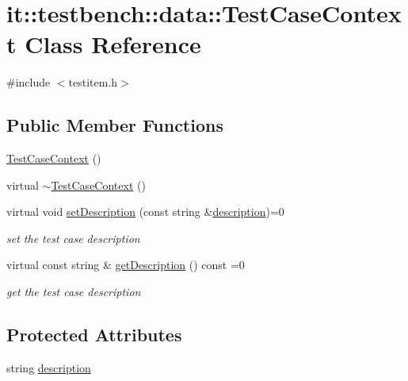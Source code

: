 \hypertarget{classit_1_1testbench_1_1data_1_1TestCaseContext}{\section{it\-:\-:testbench\-:\-:data\-:\-:Test\-Case\-Context Class Reference}
\label{d9/d60/classit_1_1testbench_1_1data_1_1TestCaseContext}
}


{\ttfamily \#include $<$testitem.\-h$>$}

\subsection*{Public Member Functions}
\begin{DoxyCompactItemize}
\item 
\hyperlink{classit_1_1testbench_1_1data_1_1TestCaseContext_ab9ad6284ea841be133f8eca9dd45109a}{Test\-Case\-Context} ()
\item 
virtual \hyperlink{classit_1_1testbench_1_1data_1_1TestCaseContext_ae3883c1f16325e36894d9215b9a19e5b}{$\sim$\-Test\-Case\-Context} ()
\item 
virtual void \hyperlink{classit_1_1testbench_1_1data_1_1TestCaseContext_aaae4618543410b39fee21b75c5e5a177}{set\-Description} (const string \&\hyperlink{classit_1_1testbench_1_1data_1_1TestCaseContext_a48eae7f179630179c3bb3cda1cbde0b0}{description})=0
\begin{DoxyCompactList}\small\item\em set the test case description \end{DoxyCompactList}\item 
virtual const string \& \hyperlink{classit_1_1testbench_1_1data_1_1TestCaseContext_a2a00e41baa1fb2c18e64ab689270b17f}{get\-Description} () const =0
\begin{DoxyCompactList}\small\item\em get the test case description \end{DoxyCompactList}\end{DoxyCompactItemize}
\subsection*{Protected Attributes}
\begin{DoxyCompactItemize}
\item 
string \hyperlink{classit_1_1testbench_1_1data_1_1TestCaseContext_a48eae7f179630179c3bb3cda1cbde0b0}{description}
\end{DoxyCompactItemize}


